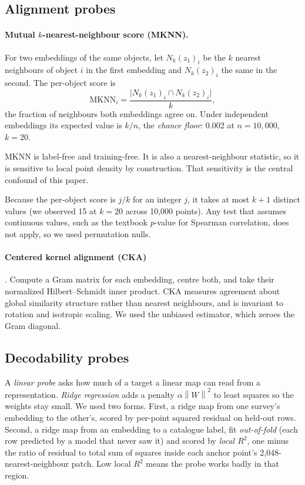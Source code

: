 \documentclass[11pt,a4paper]{article}
\newcommand{\norm}[1]{\left\lVert #1 \right\rVert}
\begin{document}
\subsection{Alignment probes}

\paragraph{Mutual $k$-nearest-neighbour score (MKNN).} For two embeddings of the same objects, let $N_k(z_1)_i$ be the $k$ nearest neighbours of object $i$ in the first embedding and $N_k(z_2)_i$ the same in the second. The per-object score is
\begin{equation}
\mathrm{MKNN}_i = \frac{\lvert N_k(z_1)_i \cap N_k(z_2)_i \rvert}{k},
\end{equation}
the fraction of neighbours both embeddings agree on. Under independent embeddings its expected value is $k/n$, the \emph{chance floor}: 0.002 at $n = 10{,}000$, $k = 20$.

MKNN is label-free and training-free. It is also a nearest-neighbour statistic, so it is sensitive to local point density by construction. That sensitivity is the central confound of this paper.

Because the per-object score is $j/k$ for an integer $j$, it takes at most $k+1$ distinct values (we observed 15 at $k = 20$ across 10{,}000 points). Any test that assumes continuous values, such as the textbook $p$-value for Spearman correlation, does not apply, so we used permutation nulls.

\paragraph{Centered kernel alignment (CKA)} \citep{kornblith2019similarity}. Compute a Gram matrix for each embedding, centre both, and take their normalized Hilbert--Schmidt inner product. CKA measures agreement about global similarity structure rather than nearest neighbours, and is invariant to rotation and isotropic scaling. We used the unbiased estimator, which zeroes the Gram diagonal.

\subsection{Decodability probes}

A \emph{linear probe} asks how much of a target a linear map can read from a representation. \emph{Ridge regression} adds a penalty $\alpha \norm{W}^2$ to least squares so the weights stay small. We used two forms. First, a ridge map from one survey's embedding to the other's, scored by per-point squared residual on held-out rows. Second, a ridge map from an embedding to a catalogue label, fit \emph{out-of-fold} (each row predicted by a model that never saw it) and scored by \emph{local $R^2$}, one minus the ratio of residual to total sum of squares inside each anchor point's 2{,}048-nearest-neighbour patch. Low local $R^2$ means the probe works badly in that region.
\end{document}
